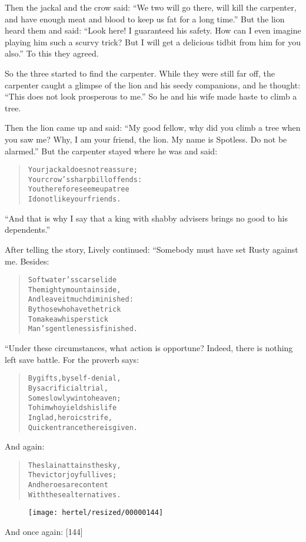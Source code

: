 \documentclass[article, twoside, 10pt]{memoir}
\renewenvironment{verbatim}{%
\begin{quote}%
\vskip -10pt%
\begin{alltt}\normalfont\small}{\end{alltt}%
\end{quote}%
\vskip -10pt
} %
\begin{document}
Then the jackal and the crow said:
``We two will go there, will kill the carpenter, and have enough meat and blood to keep us fat for a long time.''
But the lion heard them and said:
``Look here! I guaranteed his safety. How can I even imagine playing him such a scurvy trick? But I will get a delicious tidbit from him for you also.''
To this they agreed.

So the three started to find the carpenter. While they were still
far off, the carpenter caught a glimpse of the lion and his seedy
companions, and he thought:
``This does not look prosperous to me.'' So he and his wife made
haste to climb a tree.

Then the lion came up and said:
``My good fellow, why did you climb a tree when you saw me? Why, I am your friend, the lion. My name is Spotless. Do not be alarmed.''
But the carpenter stayed where he was and said:

\begin{verbatim}
Your jackal does not reassure;
    Your crow's sharp bill offends:
You therefore see me up a tree{\textemdash}
    I do not like your friends.
\end{verbatim}
``And that is why I say that a king with shabby advisers brings no good to his dependents.''

After telling the story, Lively continued: “Somebody must have set
Rusty against me. Besides:

\begin{verbatim}
Soft water's scars elide
The mighty mountain side,
    And leave it much diminished:
By those who have the trick
To make a whisper stick
    Man's gentleness is finished.
\end{verbatim}
“Under these circumstances, what action is opportune? Indeed, there
is nothing left save battle. For the proverb says:

\begin{verbatim}
By gifts, by self-denial,
By sacrificial trial,
    Some slowly win to heaven;
To him who yields his life
In glad, heroic strife,
    Quick entrance there is given.
\end{verbatim}
And again:

\begin{verbatim}
The slain attains the sky,
    The victor joyful lives;
And heroes are content
    With these alternatives.
\end{verbatim}
\begin{figure}[p]\texttt{[image: hertel/resized/00000144]}\end{figure}And once again: [144]
\end{document}

